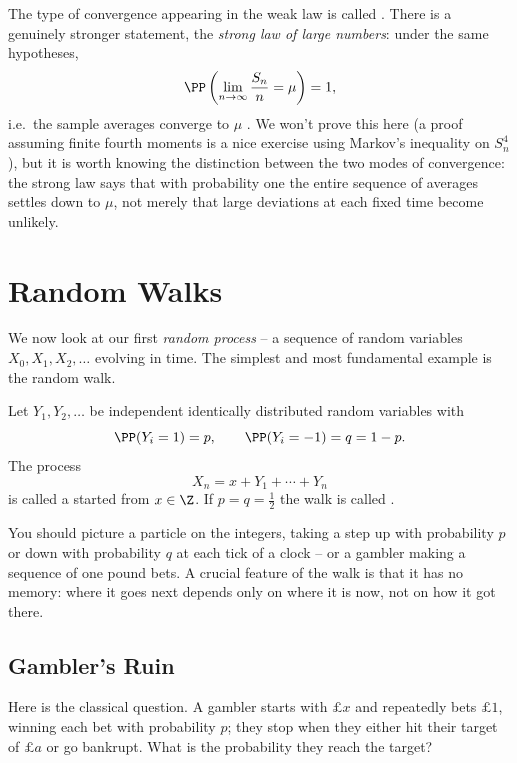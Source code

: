 \begin{remark}
	The type of convergence appearing in the weak law is called . There is a genuinely stronger statement, the \emph{strong law of large numbers}: under the same hypotheses,
	$$
	\PP\left(\lim_{n \to \infty} \frac{S_n}{n} = \mu\right) = 1,
	$$
	i.e.\ the sample averages converge to $\mu$ . We won't prove this here (a proof assuming finite fourth moments is a nice exercise using Markov's inequality on $S_n^4$), but it is worth knowing the distinction between the two modes of convergence: the strong law says that with probability one the entire sequence of averages settles down to $\mu$, not merely that large deviations at each fixed time become unlikely.
\end{remark}


\section{Random Walks}

We now look at our first \emph{random process} -- a sequence of random variables $X_0, X_1, X_2, \dots$ evolving in time. The simplest and most fundamental example is the random walk.

\begin{definition}
	Let $Y_1, Y_2, \dots$ be independent identically distributed random variables with
	$$
	\PP(Y_i = 1) = p, \qquad \PP(Y_i = -1) = q = 1 - p.
	$$
	The process
	$$
	X_n = x + Y_1 + \cdots + Y_n
	$$
	is called a  started from $x \in \Z$. If $p = q = \frac{1}{2}$ the walk is called .
\end{definition}

You should picture a particle on the integers, taking a step up with probability $p$ or down with probability $q$ at each tick of a clock -- or a gambler making a sequence of one pound bets. A crucial feature of the walk is that it has no memory: where it goes next depends only on where it is now, not on how it got there.

\subsection{Gambler's Ruin}

Here is the classical question. A gambler starts with $\pounds x$ and repeatedly bets $\pounds 1$, winning each bet with probability $p$; they stop when they either hit their target of $\pounds a$ or go bankrupt. What is the probability they reach the target?

